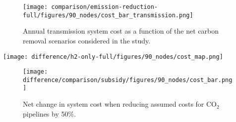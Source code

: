 \documentclass[twocolumn]{article}
\newcommand{\COtwo}{CO$_2$}
\newcommand{\Hgrid}{H$_2$\=/Grid}
\newcommand{\modH}{H$_2$\=/Grid model}
\newcommand{\modHybrid}{Hybrid model}
\begin{document}
\begin{figure}[ht]
    \centering
    \texttt{[image: comparison/emission-reduction-full/figures/90\_nodes/cost\_bar\_transmission.png]}
    \caption{Annual transmission system cost as a function of the net carbon removal scenarios considered in the study.}
    \label{fig:cost_bar_transmission}
\end{figure}


\begin{figure*}[ht]
    \centering
    \texttt{[image: difference/h2-only-full/figures/90\_nodes/cost\_map.png]}
    \caption{Difference in regional costs between the \Hgrid{} and \modHybrid{}s. The left subfigure shows higher spendings per technology and region and transport system for the \modH{}, the right shows higher spendings in the \modHybrid{}.}
    \label{fig:cost_map_difference}
\end{figure*}

\begin{figure}[htb!]
    \centering
    \texttt{[image: difference/comparison/subsidy/figures/90\_nodes/cost\_bar.png]}
    \caption[short]{Net change in system cost when reducing assumed costs for \COtwo{} pipelines by 50\%.}
    \label{fig:half-CO2-price_cost_bar}
\end{figure}
\end{document}
